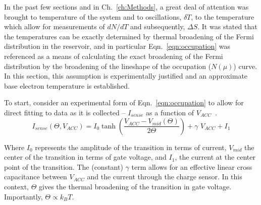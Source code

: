 In the past few sections and in Ch.~\ref{ch:Methods}, a great deal of attention was brought to temperature of the system and to oscillations, $\delta T$, to the temperature which allow for measurements of $dN/dT$ and subsequently, $\Delta S$. It was stated that the temperatures can be exactly determined by thermal broadening of the Fermi distribution in the reservoir, and in particular Eqn.~\ref{eqn:occupation} was referenced as a means of calculating the exact broadening of the Fermi distribution by the broadening of the lineshape of the occupation ($N(\mu)$) curve. In this section, this assumption is experimentally justified and an approximate base electron temperature is established. 

To start, consider an experimental form of Eqn.~\ref{eqn:occupation} to allow for direct fitting to data as it is collected -- $I_{sense}$ as a function of $V_{ACC}$~\cite{nikentropy}.
\begin{equation}
	\label{eqn:exp_isense}
	 I_{sense}(\Theta, V_{ACC}) = I_0 \tanh\left(\frac{V_{ACC} - V_{mid}(\Theta)}{2\Theta}\right) + \gamma \,\, V_{ACC} + I_1
\end{equation}

Where $I_0$ represents the amplitude of the transition in terms of current, $V_{mid}$ the center of the transition in terms of gate voltage, and $I_1$, the current at the center point of the transition. The (constant) $\gamma$ term allows for an effective linear cross capacitance between $V_{ACC}$ and the current through the charge sensor. In this context, $\Theta$ gives the thermal broadening of the transition in gate voltage. Importantly, $\Theta \propto k_B T$. 

